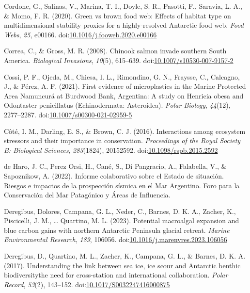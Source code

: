 \documentclass[
]{article}
\newlength{\cslhangindent}
\newenvironment{CSLReferences}[2] %
 {\begin{list}{}{%
  \setlength{\itemindent}{0pt}
  \setlength{\leftmargin}{0pt}
  \setlength{\parsep}{0pt}
  \ifodd #1
   \setlength{\leftmargin}{\cslhangindent}
   \setlength{\itemindent}{-1\cslhangindent}
  \fi
  \setlength{\itemsep}{#2\baselineskip}}}
 {\end{list}}
\begin{document}
\begin{CSLReferences}{1}{0}
Cordone, G., Salinas, V., Marina, T. I., Doyle, S. R., Pasotti, F.,
Saravia, L. A., \& Momo, F. R. (2020). Green vs brown food web:
{Effects} of habitat type on multidimensional stability proxies for a
highly-resolved {Antarctic} food web. \emph{Food Webs}, \emph{25},
e00166.
doi:\href{https://doi.org/10.1016/j.fooweb.2020.e00166}{10.1016/j.fooweb.2020.e00166}

Correa, C., \& Gross, M. R. (2008). Chinook salmon invade southern
{South America}. \emph{Biological Invasions}, \emph{10}(5), 615--639.
doi:\href{https://doi.org/10.1007/s10530-007-9157-2}{10.1007/s10530-007-9157-2}

Cossi, P. F., Ojeda, M., Chiesa, I. L., Rimondino, G. N., Fraysse, C.,
Calcagno, J., \& Pérez, A. F. (2021). First evidence of microplastics in
the {Marine Protected Area Namuncurá} at {Burdwood Bank}, {Argentina}: A
study on {Henricia} obesa and {Odontaster} penicillatus
({Echinodermata}: {Asteroidea}). \emph{Polar Biology}, \emph{44}(12),
2277--2287.
doi:\href{https://doi.org/10.1007/s00300-021-02959-5}{10.1007/s00300-021-02959-5}

Côté, I. M., Darling, E. S., \& Brown, C. J. (2016). Interactions among
ecosystem stressors and their importance in conservation.
\emph{Proceedings of the Royal Society B: Biological Sciences},
\emph{283}(1824), 20152592.
doi:\href{https://doi.org/10.1098/rspb.2015.2592}{10.1098/rspb.2015.2592}

de Haro, J. C., Perez Orsi, H., Cané, S., Di Pangracio, A., Falabella,
V., \& Sapoznikow, A. (2022). {Informe colaborativo sobre el Estado de
situación. Riesgos e impactos de la prospección sísmica en el Mar
Argentino}. {Foro para la Conservación del Mar Patagónico y Áreas de
Influencia}.

Deregibus, Dolores, Campana, G. L., Neder, C., Barnes, D. K. A., Zacher,
K., Piscicelli, J. M., \ldots{} Quartino, M. L. (2023). Potential
macroalgal expansion and blue carbon gains with northern {Antarctic
Peninsula} glacial retreat. \emph{Marine Environmental Research},
\emph{189}, 106056.
doi:\href{https://doi.org/10.1016/j.marenvres.2023.106056}{10.1016/j.marenvres.2023.106056}

Deregibus, D., Quartino, M. L., Zacher, K., Campana, G. L., \& Barnes,
D. K. A. (2017). Understanding the link between sea ice, ice scour and
{Antarctic} benthic biodiversity\textendash the need for cross-station
and international collaboration. \emph{Polar Record}, \emph{53}(2),
143--152.
doi:\href{https://doi.org/10.1017/S0032247416000875}{10.1017/S0032247416000875}


\end{CSLReferences}
\end{document}
